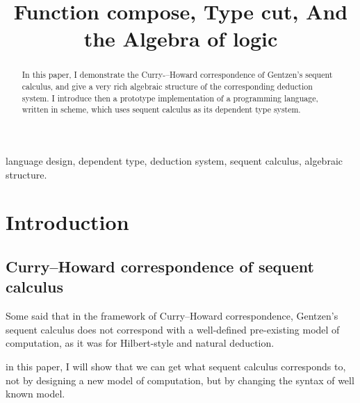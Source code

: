 \documentclass[numbers]{sigplanconf}
\begin{document}
\setlength{\pdfpageheight}{\paperheight}
\setlength{\pdfpagewidth}{\paperwidth}



\title{Function compose, Type cut, And the Algebra of logic}
\maketitle

\begin{abstract}
  In this paper, I demonstrate the Curry-–Howard correspondence of Gentzen's sequent calculus,
  and give a very rich algebraic structure of the corresponding deduction system.
  I introduce then a prototype implementation of a programming language, written in scheme, which uses sequent calculus as its dependent type system.
\end{abstract}


\keywords
language design,
dependent type,
deduction system,
sequent calculus,
algebraic structure.

\section{Introduction}

\subsection{Curry--Howard correspondence of sequent calculus}

Some said that
in the framework of Curry--Howard correspondence,
Gentzen's sequent calculus does not correspond with
a well-defined pre-existing model of computation,
as it was for Hilbert-style and natural deduction. \cite{wikipedia}

in this paper, I will show that
we can get what sequent calculus corresponds to,
not by designing a new model of computation,
but by changing the syntax of well known model.
\end{document}
